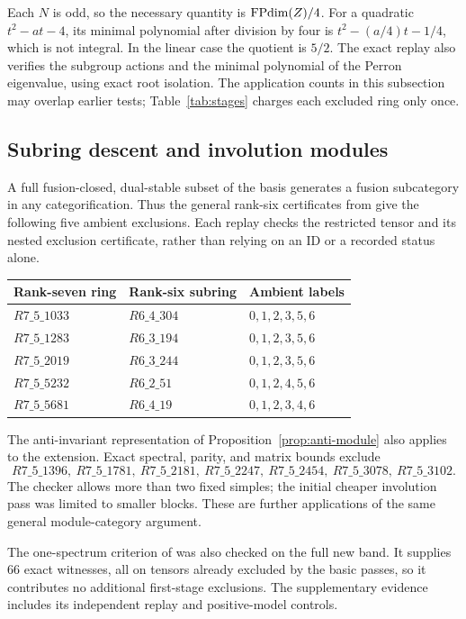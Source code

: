 Each $N$ is odd, so the necessary quantity is $\operatorname{FPdim}(Z)/4$.
For a quadratic $t^2-at-4$, its minimal polynomial after division
by four is $t^2-(a/4)t-1/4$, which is not integral.
In the linear case the quotient is $5/2$.
The exact replay also verifies the subgroup actions and the minimal
polynomial of the Perron eigenvalue, using exact root isolation.
The application counts in this subsection may overlap earlier tests;
Table~\ref{tab:stages} charges each excluded ring only once.



\subsection{Subring descent and involution modules}
A full fusion-closed, dual-stable subset of the basis generates a
fusion subcategory in any categorification. Thus the general rank-six
certificates from \cite{Rank6} give the following five ambient exclusions.
Each replay checks the restricted tensor and its nested exclusion
certificate, rather than relying on an ID or a recorded status alone.
\begin{center}\small
\begin{tabular}{@{}l l l@{}}
\toprule
Rank-seven ring & Rank-six subring & Ambient labels\\
\midrule
$R7\_5\_1033$ & $R6\_4\_304$ & $0,1,2,3,5,6$\\
$R7\_5\_1283$ & $R6\_3\_194$ & $0,1,2,3,5,6$\\
$R7\_5\_2019$ & $R6\_3\_244$ & $0,1,2,3,5,6$\\
$R7\_5\_5232$ & $R6\_2\_51$ & $0,1,2,4,5,6$\\
$R7\_5\_5681$ & $R6\_4\_19$ & $0,1,2,3,4,6$\\
\bottomrule
\end{tabular}
\end{center}

The anti-invariant representation of
Proposition~\ref{prop:anti-module} also applies to the extension.
Exact spectral, parity, and matrix bounds exclude
\[
 R7\_5\_1396,\ R7\_5\_1781,\ R7\_5\_2181,\
 R7\_5\_2247,\ R7\_5\_2454,\ R7\_5\_3078,\ R7\_5\_3102.
\]
The checker allows more than two fixed simples; the initial cheaper
involution pass was limited to smaller blocks. These are further
applications of the same general module-category argument.

The one-spectrum criterion of \cite[Theorem 6.8]{TPE} was also checked
on the full new band. It supplies $66$ exact witnesses, all on tensors
already excluded by the basic passes, so it contributes no additional
first-stage exclusions. The supplementary evidence includes its
independent replay and positive-model controls.








